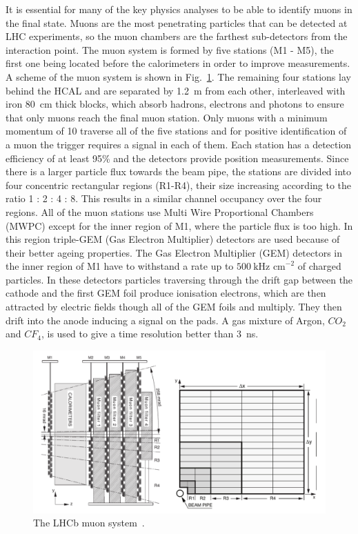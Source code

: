 It is essential for many of the key physics analyses to be able to identify muons in the final state.
Muons are the most penetrating particles that can be detected at LHC experiments, so the muon chambers
are the farthest sub-detectors from the interaction point. The muon system is formed by five stations (M1 - M5),
the first one being located before the calorimeters in order to improve \pt measurements. A scheme of the muon
system is shown in Fig.~\ref{fig:muonsystem}. The remaining four stations lay behind the HCAL
and are separated by 1.2~m
from each other, interleaved with iron 80~cm thick blocks, which absorb hadrons, electrons and photons to ensure
that only muons reach the final muon station. Only muons with a minimum momentum of 10 \gevc traverse all of the
five stations and for positive identification of a muon the trigger requires a signal in each of them.
Each station has a detection efficiency of at least 95\% and the detectors provide position measurements.
Since there is a larger particle flux towards the beam pipe, the stations are divided
into four concentric rectangular regions (R1-R4), their size increasing according to the ratio 1 : 2 : 4 : 8.
This results in a similar channel occupancy over the four regions. All of the muon stations use
Multi Wire Proportional Chambers (MWPC) except for the inner region of M1, where the particle flux is too high.
In this region triple-GEM (Gas Electron Multiplier) detectors are used because of their better ageing properties.
%
The Gas Electron Multiplier (GEM) detectors in the inner region of M1 have to withstand a rate up to
$500 ~\mbox{kHz cm}^{-2}$ of charged particles. In these detectors particles traversing through the drift gap
between the cathode and the first GEM foil produce ionisation electrons, which are then attracted by electric fields
though all of the GEM foils and multiply. They then drift into the anode inducing a signal on the pads. A gas mixture
of Argon, $CO_2$ and $CF_4$, is used to give a time resolution better than 3~ns.
%
\begin{figure}[h!]
\centering \includegraphics[width=1.0\textwidth]{Detector/figs/muon.png}
\caption{The LHCb muon system~\cite{Alves:2008zz}.}
\label{fig:muonsystem}
\end{figure}

